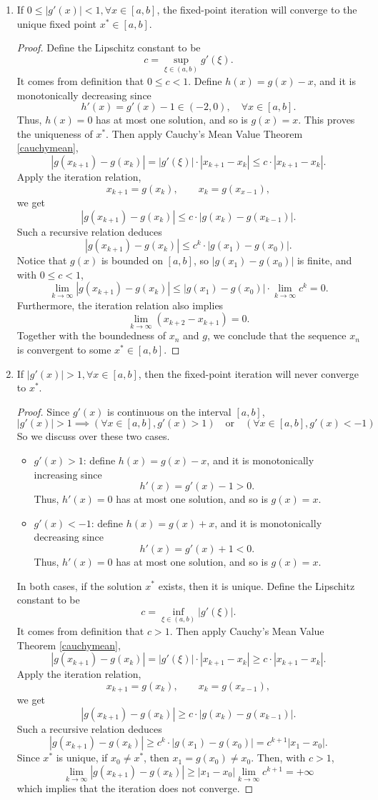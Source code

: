 \begin{enumerate}
	\item If \(0\leq|g'(x)|<1, \forall x\in[a,b]\), the fixed-point iteration will converge to the unique fixed point \(x^*\in[a,b]\).
	\begin{proof}
	Define the Lipschitz constant to be
	\[ c=\sup_{\xi\in(a,b)} g'(\xi). \]
	It comes from definition that \(0\leq c<1\).
	Define \(h(x)=g(x)-x\), and it is monotonically decreasing since
	\[ h'(x)=g'(x)-1\in(-2,0), \quad \forall x\in[a,b]. \]
	Thus, \(h(x)=0\) has at most one solution, and so is \(g(x)=x\).
	This proves the uniqueness of \(x^*\).
	Then apply Cauchy's Mean Value Theorem \ref{cauchymean},
	\[ |g(x_{k+1})-g(x_k)|=|g'(\xi)|\cdot|x_{k+1}-x_k|\leq c\cdot|x_{k+1}-x_k|. \]
	Apply the iteration relation,
	\[ x_{k+1}=g(x_k), \qquad x_k=g(x_{x-1}), \]
	we get
	\[ |g(x_{k+1})-g(x_k)|\leq c\cdot|g(x_k)-g(x_{k-1})|. \]
	Such a recursive relation deduces
	\[ |g(x_{k+1})-g(x_k)|\leq c^k\cdot|g(x_1)-g(x_0)|. \]
	Notice that \(g(x)\) is bounded on \([a,b]\), so \(|g(x_1)-g(x_0)|\) is finite, and with \(0\leq c<1\),
	\[ \lim_{k\to\infty}|g(x_{k+1})-g(x_k)|\leq |g(x_1)-g(x_0)|\cdot\lim_{k\to\infty}c^k=0. \]
	Furthermore, the iteration relation also implies
	\[ \lim_{k\to\infty}(x_{k+2}-x_{k+1})=0. \]
	Together with the boundedness of \(x_n\) and \(g\), we conclude that the sequence \(x_n\) is convergent to some \(x^*\in[a,b]\).
	\end{proof}
	\item If \(|g'(x)|>1, \forall x\in[a,b]\), then the fixed-point iteration will never converge to \(x^*\).
	\begin{proof}
	Since \(g'(x)\) is continuous on the interval \([a,b]\),
	\[ |g'(x)|>1 \implies (\forall x\in[a,b], g'(x)>1) \quad \text{or} \quad (\forall x\in[a,b], g'(x)<-1) \]
	So we discuss over these two cases.
	\begin{itemize}
		\item{\(g'(x)>1\):} define \(h(x)=g(x)-x\), and it is monotonically increasing since
		\[ h'(x)=g'(x)-1>0. \]
		Thus, \(h'(x)=0\) has at most one solution, and so is \(g(x)=x\).
		\item{\(g'(x)<-1\):} define \(h(x)=g(x)+x\), and it is monotonically decreasing since
		\[ h'(x)=g'(x)+1<0. \]
		Thus, \(h'(x)=0\) has at most one solution, and so is \(g(x)=x\).
	\end{itemize}
	In both cases, if the solution \(x^*\) exists, then it is unique.
	Define the Lipschitz constant to be
	\[ c=\inf_{\xi\in(a,b)} |g'(\xi)|. \]
	It comes from definition that \(c>1\).
	Then apply Cauchy's Mean Value Theorem \ref{cauchymean},
	\[ |g(x_{k+1})-g(x_k)|=|g'(\xi)|\cdot|x_{k+1}-x_k|\geq c\cdot|x_{k+1}-x_k|. \]
	Apply the iteration relation,
	\[ x_{k+1}=g(x_k), \qquad x_k=g(x_{x-1}), \]
	we get
	\[ |g(x_{k+1})-g(x_k)|\geq c\cdot|g(x_k)-g(x_{k-1})|. \]
	Such a recursive relation deduces
	\[ |g(x_{k+1})-g(x_k)|\geq c^k\cdot|g(x_1)-g(x_0)|=c^{k+1}|x_1-x_0|. \]
	Since \(x^*\) is unique, if \(x_0\neq x^*\), then \(x_1=g(x_0)\neq x_0\).
	Then, with \(c>1\),
	\[ \lim_{k\to\infty}|g(x_{k+1})-g(x_k)|\geq |x_1-x_0|\lim_{k\to\infty} c^{k+1}=+\infty \]
	which implies that the iteration does not converge.
	\end{proof}
\end{enumerate}



